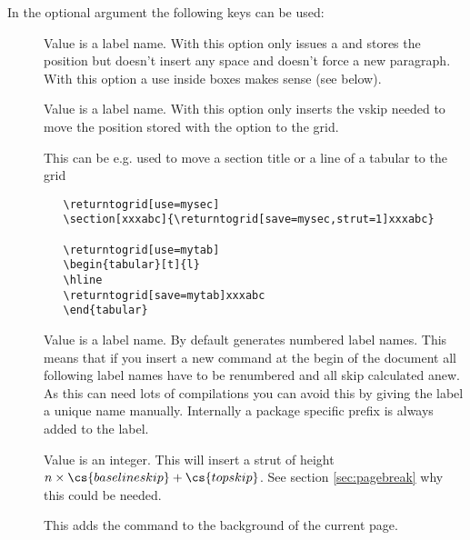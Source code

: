 \documentclass[twoside,parskip=half-,fontsize=12pt,egregdoesnotlikesansseriftitles,headings=normal]{scrartcl}
\begin{document}
In the optional argument the following keys can be used:

\begin{description}
\item[] Value is a label name. With this option  only issues a  and stores the position but doesn't insert any space and doesn't force a new paragraph. With this option a use inside boxes makes sense (see below).

\item[] Value is a label name. With this option  only inserts the vskip needed to move the position stored with the  option to the grid.

   This can be e.g. used to move a section title or a line of a tabular to the grid

   \begin{lstlisting}
   \returntogrid[use=mysec]
   \section[xxxabc]{\returntogrid[save=mysec,strut=1]xxxabc}

   \returntogrid[use=mytab]
   \begin{tabular}[t]{l}
   \hline
   \returntogrid[save=mytab]xxxabc
   \end{tabular}
   \end{lstlisting}


\item[] Value is a label name. By default  generates numbered label names. This means that if you insert a new  command at the begin of the document all following label names have to be renumbered and all skip calculated anew. As this can need lots of compilations you can avoid this by giving the label a unique name manually. Internally a package specific prefix is always added to the label.


\item[] Value is an integer. This will insert a strut of height $ n \times  \cs{baselineskip} + \cs{topskip} $. See section \ref{sec:pagebreak} why this could be needed.

\item[]  This adds the command  to the background of the current page.

\end{description}
\end{document}
